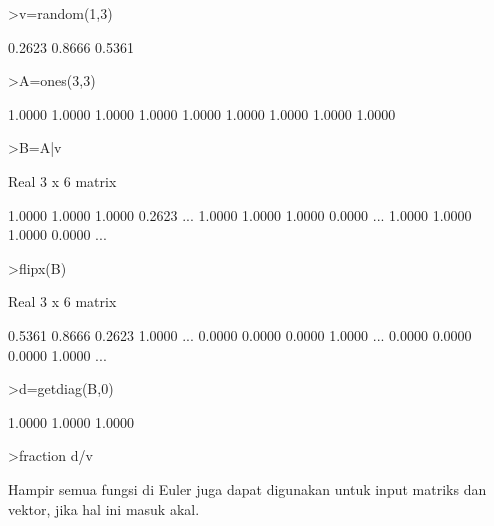 \documentclass{article}
\begin{document}
\begin{eulernotebook}
\begin{eulerprompt}
>v=random(1,3)
\end{eulerprompt}
\begin{euleroutput}
       0.2623      0.8666      0.5361 
\end{euleroutput}
\begin{eulerprompt}
>A=ones(3,3)
\end{eulerprompt}
\begin{euleroutput}
       1.0000      1.0000      1.0000 
       1.0000      1.0000      1.0000 
       1.0000      1.0000      1.0000 
\end{euleroutput}
\begin{eulerprompt}
>B=A|v
\end{eulerprompt}
\begin{euleroutput}
  Real 3 x 6 matrix
  
       1.0000      1.0000      1.0000      0.2623     ...
       1.0000      1.0000      1.0000      0.0000     ...
       1.0000      1.0000      1.0000      0.0000     ...
\end{euleroutput}
\begin{eulerprompt}
>flipx(B)
\end{eulerprompt}
\begin{euleroutput}
  Real 3 x 6 matrix
  
       0.5361      0.8666      0.2623      1.0000     ...
       0.0000      0.0000      0.0000      1.0000     ...
       0.0000      0.0000      0.0000      1.0000     ...
\end{euleroutput}
\begin{eulerprompt}
>d=getdiag(B,0)
\end{eulerprompt}
\begin{euleroutput}
       1.0000      1.0000      1.0000 
\end{euleroutput}
\begin{eulerprompt}
>fraction d/v
\end{eulerprompt}
\begin{euleroutput}
  [278845/73128,  94046/81499,  828523/444202]
\end{euleroutput}
\begin{eulercomment}
Hampir semua fungsi di Euler juga dapat digunakan untuk input matriks
dan vektor, jika hal ini masuk akal.



\end{eulercomment}
\end{eulernotebook}
\end{document}

